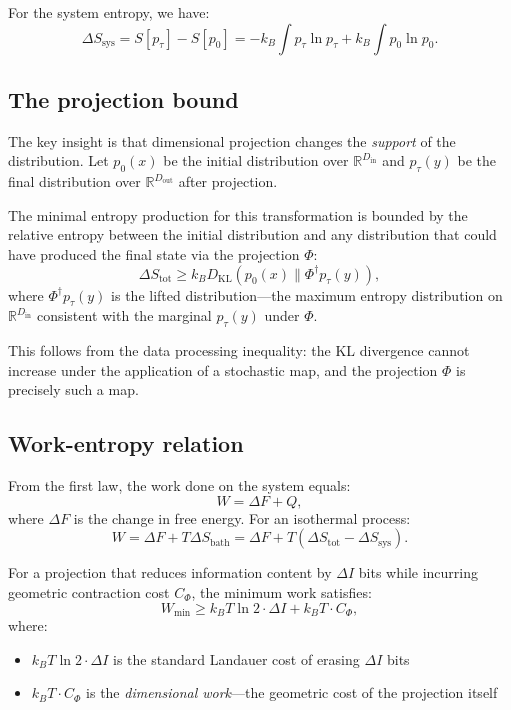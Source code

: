 \documentclass[aps,prx,twocolumn,superscriptaddress,floatfix]{revtex4-2}
\begin{document}
For the system entropy, we have:
\begin{equation}
\Delta S_\mathrm{sys} = S[p_\tau] - S[p_0] = -k_B \int p_\tau \ln p_\tau + k_B \int p_0 \ln p_0.
\end{equation}

\subsection{The projection bound}

The key insight is that dimensional projection changes the \emph{support} of the distribution. Let $p_0(x)$ be the initial distribution over $\mathbb{R}^{D_\mathrm{in}}$ and $p_\tau(y)$ be the final distribution over $\mathbb{R}^{D_\mathrm{out}}$ after projection.

The minimal entropy production for this transformation is bounded by the relative entropy between the initial distribution and any distribution that could have produced the final state via the projection $\Phi$:
\begin{equation}
\Delta S_\mathrm{tot} \geq k_B D_\mathrm{KL}(p_0(x) \| \Phi^\dagger p_\tau(y)),
\end{equation}
where $\Phi^\dagger p_\tau(y)$ is the lifted distribution---the maximum entropy distribution on $\mathbb{R}^{D_\mathrm{in}}$ consistent with the marginal $p_\tau(y)$ under $\Phi$.

This follows from the data processing inequality: the KL divergence cannot increase under the application of a stochastic map, and the projection $\Phi$ is precisely such a map.

\subsection{Work-entropy relation}

From the first law, the work done on the system equals:
\begin{equation}
W = \Delta F + Q,
\end{equation}
where $\Delta F$ is the change in free energy. For an isothermal process:
\begin{equation}
W = \Delta F + T \Delta S_\mathrm{bath} = \Delta F + T(\Delta S_\mathrm{tot} - \Delta S_\mathrm{sys}).
\end{equation}

For a projection that reduces information content by $\Delta I$ bits while incurring geometric contraction cost $C_\Phi$, the minimum work satisfies:
\begin{equation}
\boxed{W_\mathrm{min} \geq k_B T \ln 2 \cdot \Delta I + k_B T \cdot C_\Phi,}
\end{equation}
where:
\begin{itemize}
\item $k_B T \ln 2 \cdot \Delta I$ is the standard Landauer cost of erasing $\Delta I$ bits
\item $k_B T \cdot C_\Phi$ is the \emph{dimensional work}---the geometric cost of the projection itself
\end{itemize}
\end{document}
